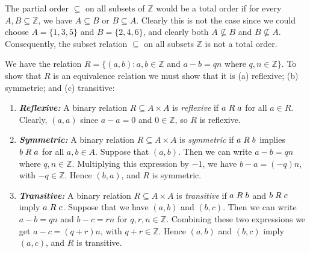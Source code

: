 \documentclass[a4paper,12pt]{article}
\begin{document}
The partial order $\subseteq$ on all subsets of $\mathbb{Z}$ would be a total order if for every $A, B \subseteq \mathbb{Z}$, we have $A \subseteq B$ or $B \subseteq A$. Clearly this is not the case since we could choose $A = \{1,3,5\}$ and $B = \{2,4,6\}$, and clearly both $A \not\subseteq B$ and $B \not\subseteq A$. Consequently, the subset relation $\subseteq$ on all subsets $\mathbb{Z}$ is not a total order. 

\vspace{5mm}

We have the relation $R = \{(a,b) : a, b \in \mathbb{Z}$ and $a - b = qn$ where $q, n \in \mathbb{Z}\}$. To show that $R$ is an equivalence relation we must show that it is (a) reflexive; (b) symmetric; and (c) transitive:

\begin{enumerate}
\item \textit{\textbf{Reflexive:}} A binary relation $R \subseteq A \times A$ is \textit{reflexive} if $a \hspace{1mm} R \hspace{1mm} a$ for all $a \in R$. Clearly, $(a,a)$ since $a - a = 0$ and $0 \in \mathbb{Z}$, so $R$ is reflexive. 

\item \textit{\textbf{Symmetric:}} A binary relation $R \subseteq A \times A$ is \textit{symmetric} if $a \hspace{1mm} R \hspace{1mm} b$ implies $b \hspace{1mm} R \hspace{1mm} a$ for all $a, b \in A$. Suppose that $(a,b)$. Then we can write $a - b = qn$ where $q, n \in \mathbb{Z}$. Multiplying this expression by $-1$, we have $b - a = (-q)n$, with $-q \in \mathbb{Z}$. Hence $(b,a)$, and $R$ is symmetric. 

\item \textit{\textbf{Transitive:}} A binary relation $R \subseteq A \times A$ is \textit{transitive} if $a \hspace{1mm} R \hspace{1mm} b$ and $b \hspace{1mm} R \hspace{1mm} c$ imply $a \hspace{1mm} R \hspace{1mm} c$. Suppose that we have $(a,b)$ and $(b,c)$. Then we can write $a - b = qn$ and $b - c = rn$ for $q, r, n \in \mathbb{Z}$. Combining these two expressions we get $a - c = (q+r)n$, with $q+r \in \mathbb{Z}$. Hence $(a,b)$ and $(b,c)$ imply $(a,c)$, and $R$ is transitive. 
\end{enumerate}
\end{document}
